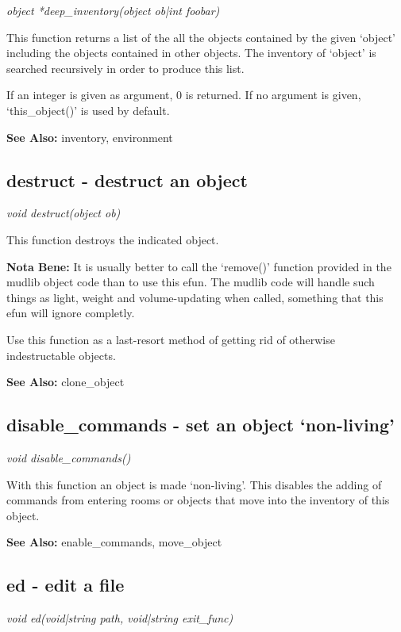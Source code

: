     {\em object *deep\_inventory(object ob|int foobar)}

    This function returns a list of the all the objects contained
    by the given `object' including the objects contained in other
    objects. The inventory of `object' is searched recursively in
    order to produce this list.

    If an integer is given as argument, 0 is returned. If no argument
    is given, `this\_object()' is used by default.

    {\bf See Also: }    inventory, environment



\subsection{destruct - destruct an object}

    {\em void destruct(object ob)}

    This function destroys the indicated object.

    {\bf Nota Bene: }   It is usually better to call the `remove()' function provided 
    in the mudlib object code than to use this efun. The mudlib code
    will handle such things as light, weight and volume-updating
    when called, something that this efun will ignore completly. 

    Use this function as a last-resort method of getting rid of
    otherwise indestructable objects.

    {\bf See Also: }    clone\_object


\subsection{disable\_commands - set an object `non-living'}

    {\em void disable\_commands()}

    With this function an object is made `non-living'. This disables
    the adding of commands from entering rooms or objects that move
    into the inventory of this object.

    {\bf See Also: }    enable\_commands, move\_object


\subsection{ed - edit a file}

    {\em void ed(void|string path, void|string exit\_func)}

